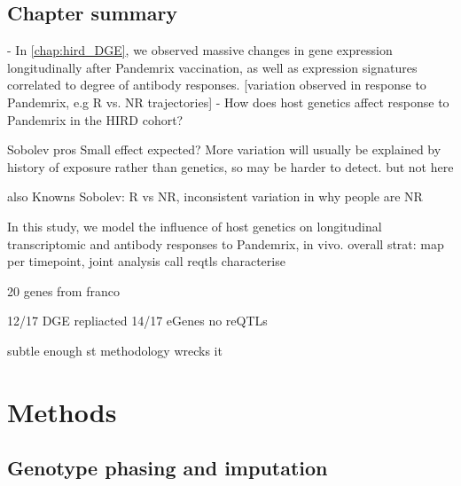 \subsection{Chapter summary}


- In \autoref{chap:hird_DGE}, we observed massive changes in gene expression longitudinally after Pandemrix vaccination, as well as expression signatures correlated to degree of antibody responses.
[variation observed in response to Pandemrix, e.g R vs. NR trajectories]
- How does host genetics affect response to Pandemrix in the HIRD cohort?

Sobolev pros
    Small effect expected?
    More variation will usually be explained by history of exposure rather than genetics, so may be harder to detect.
    but not here

also Knowns
    Sobolev: R vs NR, 
    inconsistent variation in why people are NR

In this study, we model the influence of host genetics on longitudinal transcriptomic and antibody responses to Pandemrix, in vivo.
    overall strat: map per timepoint, joint analysis
    call reqtls
    characterise

20 genes from franco

12/17 DGE repliacted
14/17 eGenes
no reQTLs

subtle enough st methodology wrecks it

\section{Methods}

\subsection{Genotype phasing and imputation}
\label{subsec:hird_reQTL_methods_genotypePhasingAndImputation}

